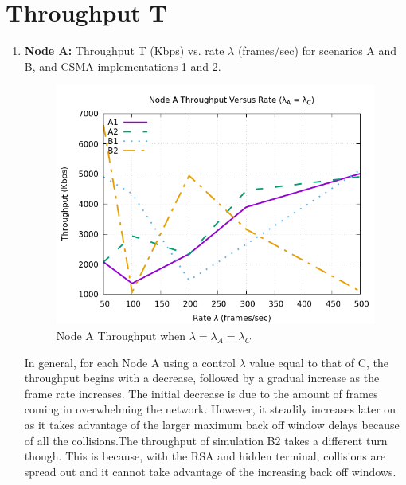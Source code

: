 \documentclass[12pt]{article}
\begin{document}
\section{Throughput T}

    \renewcommand{\labelenumi}{{\bf\alph{enumi})}}
    \begin{enumerate}
        \item { 
            {\bf Node A:} Throughput T (Kbps) vs. rate \(\lambda{}\) (frames/sec) for scenarios A and B, and CSMA implementations 1 and 2.
            
            \begin{figure}[!htb]
                \centering
                \includegraphics[width=5in]{1A.png}
                \caption{Node A Throughput when \(\lambda{} = \lambda{}_A = \lambda{}_C\) }
                \label{fig:1A}
            \end{figure}
            
            In general, for each Node A using a control \(\lambda{}\) value equal to that of C, the throughput begins with a decrease, followed by a gradual increase as the frame rate increases. The initial decrease is due to the amount of frames coming in overwhelming the network. However, it steadily increases later on as it takes advantage of the larger maximum back off window delays because of all the collisions.The throughput of simulation B2 takes a different turn though. This is because, with the RSA and hidden terminal, collisions are spread out and it cannot take advantage of the increasing back off windows.
        }
        
\clearpage


\end{enumerate}
\end{document}
